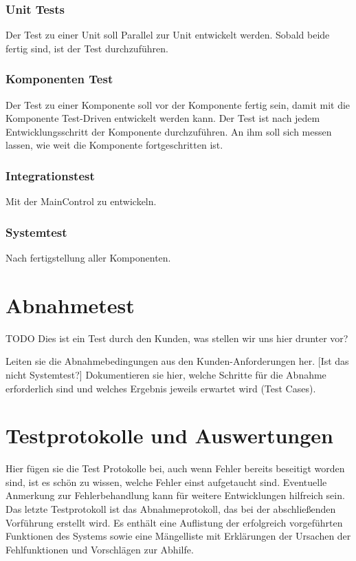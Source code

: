 \subsubsection{Unit Tests}
Der Test zu einer Unit soll Parallel zur Unit entwickelt werden. Sobald beide fertig sind, ist der Test durchzuführen.
\subsubsection{Komponenten Test}
Der Test zu einer Komponente soll vor der Komponente fertig sein, damit mit die Komponente Test-Driven entwickelt werden kann.
Der Test ist nach jedem Entwicklungsschritt der Komponente durchzuführen. An ihm soll sich messen lassen, wie weit die Komponente fortgeschritten ist.
\subsubsection{Integrationstest}
Mit der MainControl zu entwickeln.
\subsubsection {Systemtest}
Nach fertigstellung aller Komponenten.
\section{Abnahmetest}
TODO Dies ist ein Test durch den Kunden, was stellen wir uns hier drunter vor?

Leiten sie die Abnahmebedingungen aus den Kunden-Anforderungen her. [Ist das nicht Systemtest?]
Dokumentieren sie hier, welche Schritte für die Abnahme erforderlich
sind und welches Ergebnis jeweils erwartet wird (Test Cases).

\section{Testprotokolle und Auswertungen}

Hier fügen sie die Test Protokolle bei, auch wenn Fehler bereits
beseitigt worden sind, ist es schön zu wissen, welche Fehler einst
aufgetaucht sind. Eventuelle Anmerkung zur Fehlerbehandlung kann für
weitere Entwicklungen hilfreich sein.
Das letzte Testprotokoll ist das Abnahmeprotokoll, das bei der
abschließenden Vorführung erstellt wird. Es enthält eine Auflistung der
erfolgreich vorgeführten Funktionen des Systems sowie eine Mängelliste
mit Erklärungen der Ursachen der Fehlfunktionen und Vorschlägen zur
Abhilfe.
